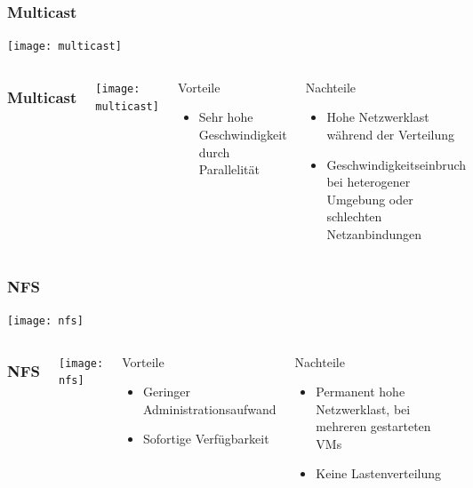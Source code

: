\documentclass{beamer}
\begin{document}
\begin{frame}
\frametitle{Multicast} 
\texttt{[image: multicast]}
\end{frame}

\begin{frame}
\begin{columns}
\column{3.8cm} 
\frametitle{Multicast} 
\texttt{[image: multicast]}
\column{6cm} 
\begin{block}{Vorteile}
\begin{itemize}
 \item Sehr hohe Geschwindigkeit durch Parallelität \pause
\end{itemize}
\end{block}

\begin{alertblock}{Nachteile}
\begin{itemize}
 \item Hohe Netzwerklast während der Verteilung \pause
 \item Geschwindigkeitseinbruch bei heterogener Umgebung oder schlechten Netzanbindungen
\end{itemize}
\end{alertblock}
\end{columns}
\end{frame}

\begin{frame}
\frametitle{NFS} 
\texttt{[image: nfs]}
\end{frame}

\begin{frame}
\begin{columns}
\column{3.8cm} 
\frametitle{NFS} 
\texttt{[image: nfs]}
\column{6cm} 
\begin{block}{Vorteile}
\begin{itemize}
 \item Geringer Administrationsaufwand \pause
 \item Sofortige Verfügbarkeit \pause
\end{itemize}
\end{block}

\begin{alertblock}{Nachteile}
\begin{itemize}
 \item Permanent hohe Netzwerklast, bei mehreren gestarteten VMs \pause
 \item Keine Lastenverteilung
\end{itemize}
\end{alertblock}
\end{columns}
\end{frame}
\end{document}
